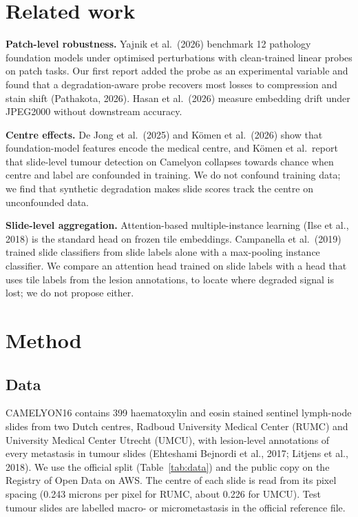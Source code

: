 \documentclass[11pt,a4paper]{article}
\begin{document}
\section{Related work}

\textbf{Patch-level robustness.} Yajnik et al.\ (2026) benchmark 12 pathology foundation models under optimised perturbations with clean-trained linear probes on patch tasks. Our first report added the probe as an experimental variable and found that a degradation-aware probe recovers most losses to compression and stain shift (Pathakota, 2026). Hasan et al.\ (2026) measure embedding drift under JPEG2000 without downstream accuracy.

\textbf{Centre effects.} De Jong et al.\ (2025) and K\"omen et al.\ (2026) show that foundation-model features encode the medical centre, and K\"omen et al.\ report that slide-level tumour detection on Camelyon collapses towards chance when centre and label are confounded in training. We do not confound training data; we find that synthetic degradation makes slide scores track the centre on unconfounded data.

\textbf{Slide-level aggregation.} Attention-based multiple-instance learning (Ilse et al., 2018) is the standard head on frozen tile embeddings. Campanella et al.\ (2019) trained slide classifiers from slide labels alone with a max-pooling instance classifier. We compare an attention head trained on slide labels with a head that uses tile labels from the lesion annotations, to locate where degraded signal is lost; we do not propose either.

\section{Method}

\subsection{Data}

CAMELYON16 contains 399 haematoxylin and eosin stained sentinel lymph-node slides from two Dutch centres, Radboud University Medical Center (RUMC) and University Medical Center Utrecht (UMCU), with lesion-level annotations of every metastasis in tumour slides (Ehteshami Bejnordi et al., 2017; Litjens et al., 2018). We use the official split (Table~\ref{tab:data}) and the public copy on the Registry of Open Data on AWS. The centre of each slide is read from its pixel spacing (0.243 microns per pixel for RUMC, about 0.226 for UMCU). Test tumour slides are labelled macro- or micrometastasis in the official reference file.
\end{document}
